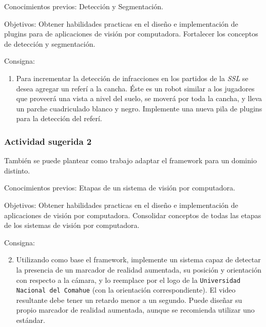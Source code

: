 \begin{description}

	\item{Conocimientos previos}: Detección y Segmentación.

	\item{Objetivos}: Obtener habilidades practicas en el diseño e
		implementación de plugins para de aplicaciones de visión por
		computadora. Fortalecer los conceptos de detección y
		segmentación.

	\item{Consigna}: \begin{enumerate}

	\item{Para incrementar la detección de infracciones en los partidos de
		la \emph{SSL} se desea agregar un referí a la cancha. Éste es un
		robot similar a los jugadores que proveerá una vista a nivel del
		suelo, se moverá por toda la cancha, y lleva un parche
		cuadriculado blanco y negro. Implemente una nueva pila de
		plugins para la detección del referí.}

\end{enumerate}

\end{description}

\subsubsection{Actividad sugerida 2}

También se puede plantear como trabajo adaptar el framework para un dominio
distinto.

\begin{description}

	\item{Conocimientos previos}: Etapas de un sistema de visión por
		computadora.

	\item{Objetivos}: Obtener habilidades practicas en el diseño e
		implementación de aplicaciones de visión por computadora.
		Consolidar conceptos de todas las etapas de los sistemas de
		visión por computadora.

	\item{Consigna}: \begin{enumerate}

	\setcounter{enumi}{1}

	\item{Utilizando como base el framework, implemente un sistema capaz de
		detectar la presencia de un marcador de realidad aumentada, su
		posición y orientación con respecto a la cámara, y lo reemplace
		por el logo de la \texttt{Universidad Nacional del Comahue} (con
		la orientación correspondiente). El video resultante debe tener
		un retardo menor a un segundo.  Puede diseñar su propio marcador
		de realidad aumentada, aunque se recomienda utilizar uno
		estándar.}

\end{enumerate}

\end{description}
